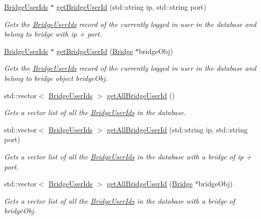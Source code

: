 \begin{DoxyCompactItemize}
\hyperlink{classBridgeUserIds}{Bridge\+User\+Ids} $\ast$ \hyperlink{classSession_a23fa8d97108b7a713ca7dcf9808cccbe}{get\+Bridge\+User\+Id} (std\+::string ip, std\+::string port)
\begin{DoxyCompactList}\small\item\em Gets the \hyperlink{classBridgeUserIds}{Bridge\+User\+Ids} record of the currently logged in user in the database and belong to bridge with ip + port. \end{DoxyCompactList}\item 
\hyperlink{classBridgeUserIds}{Bridge\+User\+Ids} $\ast$ \hyperlink{classSession_a9ffa12700d2c5c76d182def0889bb78f}{get\+Bridge\+User\+Id} (\hyperlink{classBridge}{Bridge} $\ast$bridge\+Obj)
\begin{DoxyCompactList}\small\item\em Gets the \hyperlink{classBridgeUserIds}{Bridge\+User\+Ids} record of the currently logged in user in the database and belong to bridge object bridge\+Obj. \end{DoxyCompactList}\item 
std\+::vector$<$ \hyperlink{classBridgeUserIds}{Bridge\+User\+Ids} $>$ \hyperlink{classSession_a38d17c83c95082958506a5879eff7c93}{get\+All\+Bridge\+User\+Id} ()
\begin{DoxyCompactList}\small\item\em Gets a vector list of all the \hyperlink{classBridgeUserIds}{Bridge\+User\+Ids} in the database. \end{DoxyCompactList}\item 
std\+::vector$<$ \hyperlink{classBridgeUserIds}{Bridge\+User\+Ids} $>$ \hyperlink{classSession_a0c60934144d2e92258c33f3560642293}{get\+All\+Bridge\+User\+Id} (std\+::string ip, std\+::string port)
\begin{DoxyCompactList}\small\item\em Gets a vector list of all the \hyperlink{classBridgeUserIds}{Bridge\+User\+Ids} in the database with a bridge of ip + port. \end{DoxyCompactList}\item 
std\+::vector$<$ \hyperlink{classBridgeUserIds}{Bridge\+User\+Ids} $>$ \hyperlink{classSession_aebdcfdb0abc3e0eff515fcf274eec8b7}{get\+All\+Bridge\+User\+Id} (\hyperlink{classBridge}{Bridge} $\ast$bridge\+Obj)
\begin{DoxyCompactList}\small\item\em Gets a vector list of all the \hyperlink{classBridgeUserIds}{Bridge\+User\+Ids} in the database with a bridge of bridge\+Obj. \end{DoxyCompactList}\item 

\end{DoxyCompactItemize}
